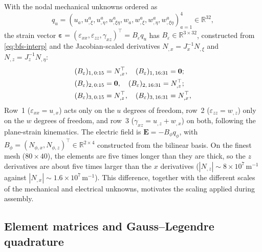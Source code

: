 \documentclass[a4paper,12pt]{elsarticle}
\begin{document}
With the nodal mechanical unknowns ordered as
\[
q_u=(u_a,u_{,\xi}^a,u_{,\eta}^a,u_{,\xi\eta}^a,
w_a,w_{,\xi}^a,w_{,\eta}^a,w_{,\xi\eta}^a)_{a=1}^{4}\in\mathbb{R}^{32},
\]
the strain vector
$\bm\varepsilon=(\varepsilon_{xx},\varepsilon_{zz},\gamma_{xz})^\top
=B_\varepsilon q_u$ has $B_\varepsilon\in\mathbb{R}^{3\times32}$, constructed from
\eqref{eq:bfs-interp} and the Jacobian-scaled derivatives
$N_{,x}=J_x^{-1}N_{,\xi}$ and $N_{,z}=J_z^{-1}N_{,\eta}$:
\begin{align}
(B_\varepsilon)_{1,\,0:15}&=N_{,x}^\top,\quad
(B_\varepsilon)_{1,\,16:31}=\bm0;\notag\\
(B_\varepsilon)_{2,\,0:15}&=\bm0,\quad
(B_\varepsilon)_{2,\,16:31}=N_{,z}^\top;\notag\\
(B_\varepsilon)_{3,\,0:15}&=N_{,z}^\top,\quad
(B_\varepsilon)_{3,\,16:31}=N_{,x}^\top,
\label{eq:Beps}
\end{align}
Row~1 ($\varepsilon_{xx}=u_{,x}$) acts only on the $u$ degrees of freedom,
row~2 ($\varepsilon_{zz}=w_{,z}$) only on the $w$ degrees of freedom, and row~3
($\gamma_{xz}=u_{,z}+w_{,x}$) on both, following the plane-strain kinematics. The electric field is
$\bm E=-B_\phi q_\phi$, with
$B_\phi=(N_{\phi,x},N_{\phi,z})^\top\in\mathbb{R}^{2\times4}$ constructed from the
bilinear basis. On the finest mesh ($80\times40$), the elements are five times longer
than they are thick, so the $z$ derivatives are about five times larger than the
$x$ derivatives ($|N_{,z}|\sim8\times10^{7}\,\text{m}^{-1}$ against
$|N_{,x}|\sim1.6\times10^{7}\,\text{m}^{-1}$). This difference, together with the
different scales of the mechanical and electrical unknowns, motivates the scaling
applied during assembly.

\subsection{Element matrices and Gauss--Legendre quadrature}
\end{document}
